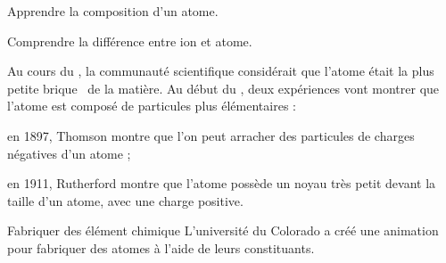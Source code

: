 \sndEnTeteTrois

\vspace*{-44pt}


\begin{objectifs}
  \item Apprendre la composition d'un atome.
  \item Comprendre la différence entre ion et atome.
\end{objectifs}

\begin{contexte}
  Au cours du , la communauté scientifique considérait que l'atome était la plus petite \og brique \fg\, de la matière.
  Au début du , deux expériences vont montrer que l'atome est composé de particules plus élémentaires :
  \begin{listePoints}
    \item en 1897, Thomson montre que l'on peut arracher des particules de charges négatives d'un atome ;
    \item en 1911, Rutherford montre que l'atome possède un noyau très petit devant la taille d'un atome, avec une charge positive.
  \end{listePoints}
  
\end{contexte}


\begin{doc}{Fabriquer des élément chimique}
  L'université du Colorado a créé une animation pour fabriquer des atomes à l'aide de leurs constituants.
  
\end{doc}




\begin{flushleft}  
\end{flushleft}

\vspace*{-30pt}

